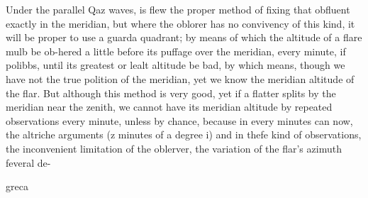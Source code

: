 Under the parallel Qaz waves, is flew the proper method of fixing that obfluent exactly in the meridian, but where the oblorer has no convivency of this kind, it will be proper to use a guarda quadrant; by means of which the altitude of a flare mulb be ob-hered a little before its puffage over the meridian, every minute, if polibbs, until its greatest or lealt altitude be bad, by which means, though we have not the true polition of the meridian, yet we know the meridian altitude of the flar. But although this method is very good, yet if a flatter splits by the meridian near the zenith, we cannot have its meridian altitude by repeated observations every minute, unless by chance, because in every minutes can now, the altriche arguments (z minutes of a degree i) and in thefe kind of observations, the inconvenient limitation of the oblerver, the variation of the flar's azimuth feveral de-\par\medskip
greca\par\medskip
